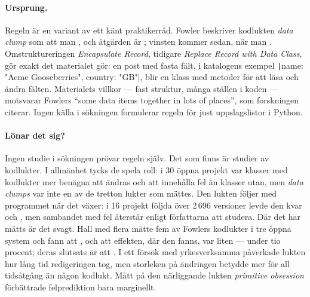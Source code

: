 \paragraph{Ursprung.}  Regeln är en variant av ett känt praktikerråd.
Fowler beskriver kodlukten \emph{data clump} som att man
, och åtgärden är
; vinsten kommer sedan, när man
.  Omstruktureringen \emph{Encapsulate Record},
tidigare \emph{Replace Record with Data Class}, gör exakt det materialet
gör: en post med fasta fält, i katalogens exempel
\texttt|{name: "Acme Gooseberries", country: "GB"}|, blir
en klass med metoder för att läsa och ändra
fälten\autocite{Fowler2018EncapsulateRecord}.  Materialets villkor
--- fast struktur, många ställen i koden --- motsvarar Fowlers
\enquote{some data items together in lots of places}, som
forskningen citerar\autocite[tabell~I]{Hall2014Smells}.  Ingen källa i
sökningen formulerar regeln för just uppslagslistor i Python.

\paragraph{Lönar det sig?}  Ingen studie i sökningen prövar regeln
själv.  Det som finns är studier av kodlukter.  I allmänhet tycks de
spela roll: i 30 öppna projekt var klasser med kodlukter mer benägna att
ändras och att innehålla fel än klasser utan\autocite{Palomba2018Smells},
men \emph{data clumps} var inte en av de tretton lukter som mättes.  Den
lukten följer med programmet när det växer: i 16 projekt följda över
2\,696 versioner levde den kvar och , men sambandet
med fel återstår enligt författarna att studera.  Där det har mätts är
det svagt.  Hall med flera mätte
fem av Fowlers kodlukter i tre öppna system och fann att
, och att effekten, där den
fanns, var liten --- under tio procent; deras slutsats är att
.  I ett försök med yrkesverksamma påverkade lukten hur
lång tid redigeringen tog, men storleken på ändringen betydde mer för
all tidsåtgång än någon kodlukt\autocite{Soh2016Smells}.  Mått på den
närliggande lukten \emph{primitive obsession} förbättrade
felprediktion bara marginellt\autocite{Pengo2021Primitive}.

